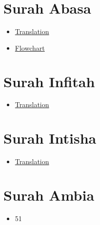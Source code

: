 \documentclass[11pt]{article}
\author{ok}
\date{\today}
\title{}
\begin{document}
\tableofcontents

\section{Surah Abasa}
\label{sec:orgdfb4de8}
\begin{itemize}
\item \href{https://quranonline786.com/surah-abasa-with-urdu-translation/}{Translation}
\item \href{https://nurulquran.com/surah-abasa-urdu-flowchart/}{Flowchart}
\end{itemize}
\section{Surah Infitah}
\label{sec:orga44b2ff}
\begin{itemize}
\item \href{https://quranonline786.com/surah-al-infitar-with-urdu-translation/}{Translation}
\end{itemize}
\section{Surah Intisha}
\label{sec:org86bf57b}
\begin{itemize}
\item \href{https://quranonline786.com/surah-al-inshiqaq-with-urdu-translation/}{Translation}
\end{itemize}
\section{Surah Ambia}
\label{sec:org97c4eda}
\begin{itemize}
\item 51
\end{itemize}
\end{document}
